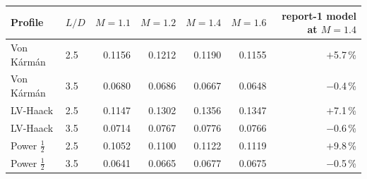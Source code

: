 \begin{tabular}{@{}llrrrrr@{}}
\toprule
Profile & $L/D$ & $M=1.1$ & $M=1.2$ & $M=1.4$ & $M=1.6$ & report-1 model at $M=1.4$ \\
\midrule
Von K\'arm\'an & 2.5 & 0.1156 & 0.1212 & 0.1190 & 0.1155 & $+$5.7\,\% \\
Von K\'arm\'an & 3.5 & 0.0680 & 0.0686 & 0.0667 & 0.0648 & $-$0.4\,\% \\
LV-Haack & 2.5 & 0.1147 & 0.1302 & 0.1356 & 0.1347 & $+$7.1\,\% \\
LV-Haack & 3.5 & 0.0714 & 0.0767 & 0.0776 & 0.0766 & $-$0.6\,\% \\
Power $\tfrac12$ & 2.5 & 0.1052 & 0.1100 & 0.1122 & 0.1119 & $+$9.8\,\% \\
Power $\tfrac12$ & 3.5 & 0.0641 & 0.0665 & 0.0677 & 0.0675 & $-$0.5\,\% \\
\bottomrule
\end{tabular}

